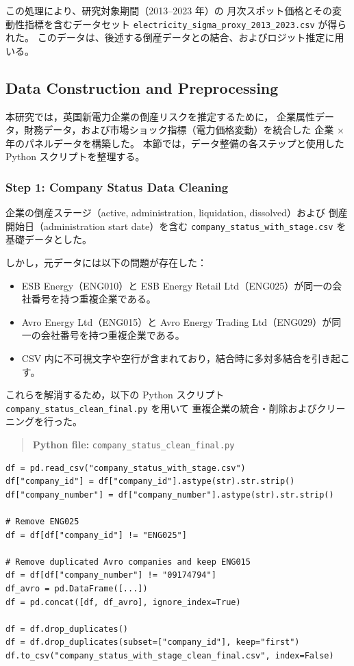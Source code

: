 この処理により、研究対象期間（2013--2023 年）の
月次スポット価格とその変動性指標を含むデータセット
\texttt{electricity\_sigma\_proxy\_2013\_2023.csv} が得られた。
このデータは、後述する倒産データとの結合、およびロジット推定に用いる。


\subsection*{Data Construction and Preprocessing}

本研究では，英国新電力企業の倒産リスクを推定するために，
企業属性データ，財務データ，および市場ショック指標（電力価格変動）を統合した
企業 $\times$ 年のパネルデータを構築した。
本節では，データ整備の各ステップと使用した Python スクリプトを整理する。

\subsubsection*{Step 1: Company Status Data Cleaning}

企業の倒産ステージ（active, administration, liquidation, dissolved）および
倒産開始日（administration start date）を含む
\texttt{company\_status\_with\_stage.csv} を基礎データとした。

しかし，元データには以下の問題が存在した：

\begin{itemize}
  \item ESB Energy（ENG010）と ESB Energy Retail Ltd（ENG025）が同一の会社番号を持つ重複企業である。
  \item Avro Energy Ltd（ENG015）と Avro Energy Trading Ltd（ENG029）が同一の会社番号を持つ重複企業である。
  \item CSV 内に不可視文字や空行が含まれており，結合時に多対多結合を引き起こす。
\end{itemize}

これらを解消するため，以下の Python スクリプト
\texttt{company\_status\_clean\_final.py} を用いて
重複企業の統合・削除およびクリーニングを行った。

\begin{quote}
\textbf{Python file:} \texttt{company\_status\_clean\_final.py}
\end{quote}

\begin{verbatim}
df = pd.read_csv("company_status_with_stage.csv")
df["company_id"] = df["company_id"].astype(str).str.strip()
df["company_number"] = df["company_number"].astype(str).str.strip()

# Remove ENG025
df = df[df["company_id"] != "ENG025"]

# Remove duplicated Avro companies and keep ENG015
df = df[df["company_number"] != "09174794"]
df_avro = pd.DataFrame([...])
df = pd.concat([df, df_avro], ignore_index=True)

df = df.drop_duplicates()
df = df.drop_duplicates(subset=["company_id"], keep="first")
df.to_csv("company_status_with_stage_clean_final.csv", index=False)
\end{verbatim}

